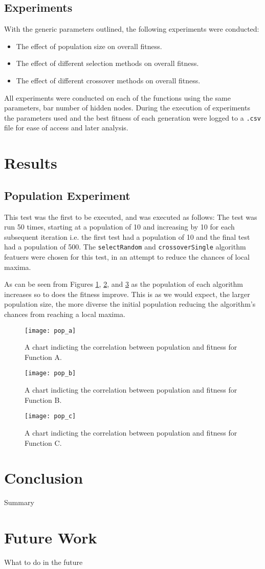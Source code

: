 	\subsection{Experiments}
		With the generic parameters outlined, the following experiments were conducted:
		\begin{itemize}
			\item The effect of population size on overall fitness.
			\item The effect of different selection methods on overall fitness.
			\item The effect of different crossover methods on overall fitness.
		\end{itemize}
	
		All experiments were conducted on each of the functions using the same parameters, bar number of hidden nodes. During the execution of experiments the parameters used and the best fitness of each generation were logged to a \texttt{.csv} file for ease of access and later analysis.

\section{Results}
	\subsection{Population Experiment}
		This test was the first to be executed, and was executed as follows:
		The test was run 50 times, starting at a population of 10 and increasing by 10 for each subsequent iteration i.e. the first test had a population of 10 and the final test had a population of 500. The \texttt{selectRandom} and \texttt{crossoverSingle} algorithm featuers were chosen for this test, in an attempt to reduce the chances of local maxima.
		
		As can be seen from Figures \ref{chart_pop_a}, \ref{chart_pop_b},  and \ref{chart_pop_c} as the population of each algorithm increases so to does the fitness improve. This is as we would expect, the larger population size, the more diverse the initial population reducing the algorithm's chances from reaching a local maxima. 
		\begin{figure}[h]
			\centering
			\texttt{[image: pop\_a]}
			\caption{A chart indicting the correlation between population and fitness for Function A.}
			\label{chart_pop_a}
		\end{figure} 

		\begin{figure}[h]
			\centering
			\texttt{[image: pop\_b]}
			\caption{A chart indicting the correlation between population and fitness for Function B.}
			\label{chart_pop_b}
		\end{figure}

		\begin{figure}[h]
			\centering
			\texttt{[image: pop\_c]}
			\caption{A chart indicting the correlation between population and fitness for Function C.}
			\label{chart_pop_c}
		\end{figure} 

\section{Conclusion}
	Summary

\section{Future Work}
	What to do in the future
	